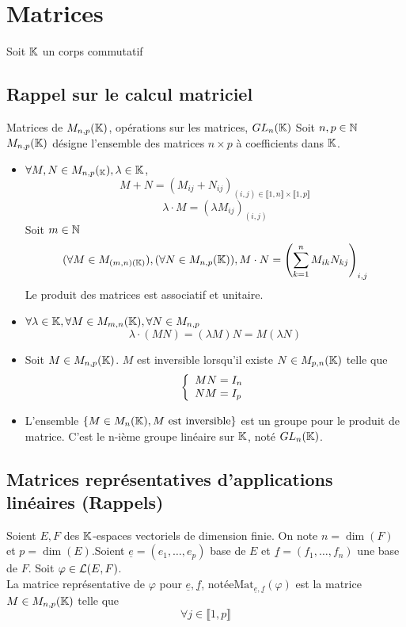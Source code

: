 \documentclass[]{report}
\begin{document}
\section{Matrices}

Soit $\mathbb{K}$ un corps commutatif

\subsection{Rappel sur le calcul matriciel}

\begin{df}{Matrices de $M_{n,p}(\mathbb{K})$, opérations sur les matrices, $GL_n(\mathbb{K})$}{}
    Soit $n,p\in \mathbb{N}$\\
    $M_{n,p}(\mathbb{K})$ désigne l'ensemble des matrices $n\times p$ à coefficients dans $\mathbb{K}$.\\
    \begin{itemize}
        \item $\forall M,N\in M_{n,p}(_{\mathbb{K}}),\lambda \in \mathbb{K}$,
        \[M+N=\left(M_{ij}+N_{ij}\right)_{(i,j)\in \llbracket 1,n\rrbracket\times  \llbracket 1,p\rrbracket}\]
        \[\lambda \cdot M = \left( \lambda M_{ij}\right)_{(i,j)}\]
        Soit $m\in \mathbb{N}$
        \[(\forall M\in M_{(m,n)(\mathbb{K})}),(\forall N\in M_{n,p} (\mathbb{K})), M\cdot N= \left(\sum_{k=1}^{n} M_{ik} N_{kj}\right)_{i,j}\]
        Le produit des matrices est associatif et unitaire.\\
        \item $\forall \lambda\in \mathbb{K},\forall M\in M_{m,n}(\mathbb{K}),\forall N\in M_{n,p}$
        \[\lambda \cdot (MN)=(\lambda M) N= M(\lambda N)\]
        \item Soit $M\in M_{n,p}(\mathbb{K})$. $M$ est inversible lorsqu'il existe $N\in M_{p,n}(\mathbb{K})$ telle que
        \[\left\{\begin{array}{ll} MN=I_n\\ NM=I_p \end{array} \right.\]
        \item L'ensemble $\{M\in M_n (\mathbb{K}),M\text{ est inversible}\}$  est un groupe pour le produit de matrice. C'est le n-ième groupe linéaire sur $\mathbb{K}$, noté $GL_n(\mathbb{K})$.
    \end{itemize}
\end{df}

\subsection{Matrices représentatives d'applications linéaires (Rappels)}

Soient $E,F$ des $\mathbb{K}$-espaces vectoriels de dimension finie. On note $n=\dim (F)$ et $p=\dim(E)$.Soient $\underline{e}=(e_1,\ldots,e_p)$ base de $E$ et $\underline{f}=(f_1,\ldots,f_n)$ une base de $F$. Soit $\varphi\in \mathcal{L}(E,F)$.\\
La matrice représentative de $\varphi$ pour $\underline{e},\underline{f}$, notée$\text{Mat}_{\underline{e},\underline{f}}(\varphi)$ est la matrice $M\in M_{n,p}(\mathbb{K})$ telle que
\[\forall j\in \llbracket 1,p \rrbracket\]
\end{document}
